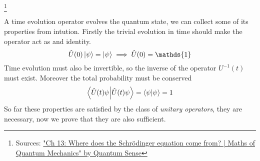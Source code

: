 \footnote{Sources:
  \href{https://youtu.be/KmFG_QNSZzA?si=pl9x9JqUh-3kMOiQ}
  {"Ch 13: Where does the Schrödinger equation come from? | Maths of Quantum Mechanics" by Quantum Sense}
}

\begin{multicols}{3}
  A time evolution operator evolves the quantum state, we can collect some of its properties from intution.
  Firstly the trivial evolution in time should make the operator act as and identity.
  \begin{equation*}
    \hat{U}(0) \ket\psi = \ket\psi \implies \hat{U}(0) = \mathds{1}
  \end{equation*}
  Time evolution must also be invertible, so the inverse of the operator $U^{-1}(t)$ must exist.
  Moreover the total probability must be conserved
  \begin{equation*}
    \braket{\hat{U}(t)\psi} = \braket\psi = 1
  \end{equation*}
  So far these properties are satisfied by the class of \textit{unitary operators}, they are necessary,
  now we prove that they are also sufficient. \\


\end{multicols}
